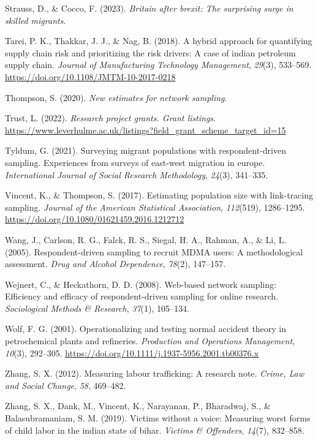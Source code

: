 \documentclass[
  12pt,
]{article}
\newlength{\cslhangindent}
\newenvironment{CSLReferences}[2] %
 {\begin{list}{}{%
  \setlength{\itemindent}{0pt}
  \setlength{\leftmargin}{0pt}
  \setlength{\parsep}{0pt}
  \ifodd #1
   \setlength{\leftmargin}{\cslhangindent}
   \setlength{\itemindent}{-1\cslhangindent}
  \fi
  \setlength{\itemsep}{#2\baselineskip}}}
 {\end{list}}
\theoremstyle{plain}
\theoremstyle{definition}
\begin{document}
\begin{CSLReferences}{1}{0}
Strauss, D., \& Cocco, F. (2023). \emph{Britain after brexit: The
surprising surge in skilled migrants}.

Tarei, P. K., Thakkar, J. J., \& Nag, B. (2018). A hybrid approach for
quantifying supply chain risk and prioritizing the risk drivers: A case
of indian petroleum supply chain. \emph{Journal of Manufacturing
Technology Management}, \emph{29}(3), 533--569.
\url{https://doi.org/10.1108/JMTM-10-2017-0218}

Thompson, S. (2020). \emph{New estimates for network sampling}.

Trust, L. (2022). \emph{Research project grants. Grant listings}.
\url{https://www.leverhulme.ac.uk/listings?field_grant_scheme_target_id=15}

Tyldum, G. (2021). Surveying migrant populations with respondent-driven
sampling. Experiences from surveys of east-west migration in europe.
\emph{International Journal of Social Research Methodology},
\emph{24}(3), 341--335.

Vincent, K., \& Thompson, S. (2017). Estimating population size with
link-tracing sampling. \emph{Journal of the American Statistical
Association}, \emph{112}(519), 1286--1295.
\url{https://doi.org/10.1080/01621459.2016.1212712}

Wang, J., Carlson, R. G., Falck, R. S., Siegal, H. A., Rahman, A., \&
Li, L. (2005). Respondent-driven sampling to recruit {MDMA} users: A
methodological assessment. \emph{Drug and Alcohol Dependence},
\emph{78}(2), 147--157.

Wejnert, C., \& Heckathorn, D. D. (2008). Web-based network sampling:
Efficiency and efficacy of respondent-driven sampling for online
research. \emph{Sociological Methods \& Research}, \emph{37}(1),
105--134.

Wolf, F. G. (2001). Operationalizing and testing normal accident theory
in petrochemical plants and refineries. \emph{Production and Operations
Management}, \emph{10}(3), 292--305.
\url{https://doi.org/10.1111/j.1937-5956.2001.tb00376.x}

Zhang, S. X. (2012). Measuring labour trafficking: A research note.
\emph{Crime, Law and Social Change}, \emph{58}, 469--482.

Zhang, S. X., Dank, M., Vincent, K., Narayanan, P., Bharadwaj, S., \&
Balasubramaniam, S. M. (2019). Victims without a voice: Measuring worst
forms of child labor in the indian state of bihar. \emph{Victims \&
Offenders}, \emph{14}(7), 832--858.

\end{CSLReferences}
\end{document}
